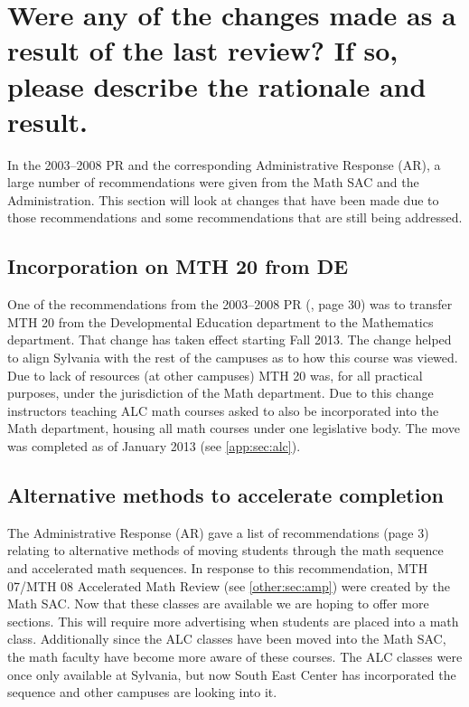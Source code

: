 \section[Changes resulting from the last program review]{Were any of the changes made as a result of the last review? If so,
please describe the rationale and result.}\label{over:sec:changesresult}

In the 2003--2008 PR and the corresponding Administrative
Response (AR), a large number of recommendations were given from the Math SAC and
the Administration.  This section will look at changes that have been made due
to those recommendations and some recommendations that are still being
addressed.

\subsection{Incorporation on MTH 20 from DE}
One of the recommendations from the 2003--2008 PR (\cite{mathprogramreview2003}, page 30) was to transfer MTH
20 from the Developmental Education department to the Mathematics department.
That change has taken effect starting Fall 2013.  The change helped to align
Sylvania with the rest of the campuses as to how this course was viewed.   Due
to lack of resources (at other campuses) MTH 20 was, for all practical purposes,
under the jurisdiction of the Math department.  Due to this change instructors
teaching ALC math courses asked to also be incorporated into the Math
department, housing all math courses under one legislative body.  The move was
completed as of January 2013 (see \vref{app:sec:alc}).

\subsection{Alternative methods to accelerate completion}
The Administrative Response (AR) gave a list of recommendations (page 3) relating to alternative methods
of moving students through the math sequence and accelerated math sequences.  In
response to this recommendation, MTH 07/MTH 08 Accelerated Math Review (see \vref{other:sec:amp}) were created by the Math SAC.
Now that these classes are available we are hoping to offer more sections.  This
will require more advertising when students are placed into a math class.
Additionally since the ALC classes have been moved into the Math SAC, the math
faculty have become more aware of these courses.  The ALC classes were once only
available at Sylvania, but now South East Center has incorporated the sequence
and other campuses are looking into it.

